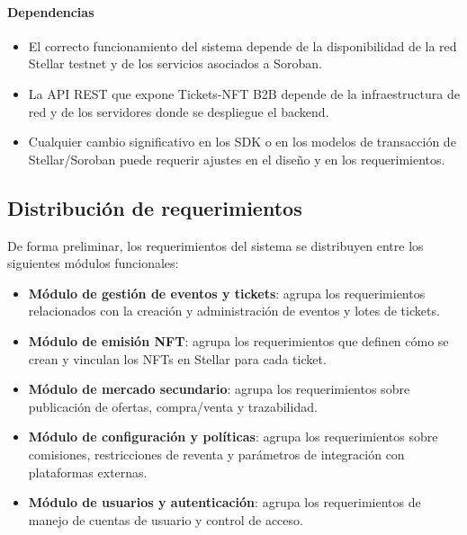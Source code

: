 \documentclass[12pt,letterpaper]{article}
\begin{document}
\paragraph{Dependencias}

\begin{itemize}
    \item El correcto funcionamiento del sistema depende de la disponibilidad
          de la red Stellar testnet y de los servicios asociados a Soroban.
    \item La API REST que expone Tickets-NFT B2B depende de la infraestructura
          de red y de los servidores donde se despliegue el backend.
    \item Cualquier cambio significativo en los SDK o en los modelos de
          transacción de Stellar/Soroban puede requerir ajustes en el diseño y
          en los requerimientos.
\end{itemize}

\subsection{Distribución de requerimientos}

De forma preliminar, los requerimientos del sistema se distribuyen entre los
siguientes módulos funcionales:

\begin{itemize}
    \item \textbf{Módulo de gestión de eventos y tickets}: agrupa los
          requerimientos relacionados con la creación y administración de
          eventos y lotes de tickets.
    \item \textbf{Módulo de emisión NFT}: agrupa los requerimientos que
          definen cómo se crean y vinculan los NFTs en Stellar para cada
          ticket.
    \item \textbf{Módulo de mercado secundario}: agrupa los requerimientos
          sobre publicación de ofertas, compra/venta y trazabilidad.
    \item \textbf{Módulo de configuración y políticas}: agrupa los
          requerimientos sobre comisiones, restricciones de reventa y
          parámetros de integración con plataformas externas.
    \item \textbf{Módulo de usuarios y autenticación}: agrupa los
          requerimientos de manejo de cuentas de usuario y control de acceso.
\end{itemize}
\end{document}
